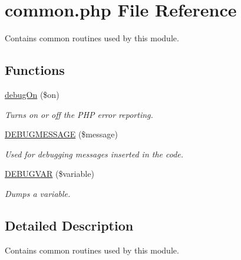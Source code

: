 \hypertarget{common_8php}{\section{common.\+php File Reference}
\label{common_8php}
}


Contains common routines used by this module. \subsubsection*{} 


\subsection*{Functions}
\begin{DoxyCompactItemize}
\item 
\hyperlink{common_8php_a93135491e5de25e59c12fc26fa43102c}{debug\+On} (\$on)
\begin{DoxyCompactList}\small\item\em Turns on or off the P\+H\+P error reporting. \end{DoxyCompactList}\item 
\hyperlink{common_8php_a05ca8b5390ded603e486ca185d1ffcc4}{D\+E\+B\+U\+G\+M\+E\+S\+S\+A\+G\+E} (\$message)
\begin{DoxyCompactList}\small\item\em Used for debugging messages inserted in the code. \end{DoxyCompactList}\item 
\hyperlink{common_8php_a437290c247cf51d3a8d8f3abf60b5b51}{D\+E\+B\+U\+G\+V\+A\+R} (\$variable)
\begin{DoxyCompactList}\small\item\em Dumps a variable. \end{DoxyCompactList}\end{DoxyCompactItemize}


\subsection{Detailed Description}
Contains common routines used by this module. \subsubsection*{}



 



